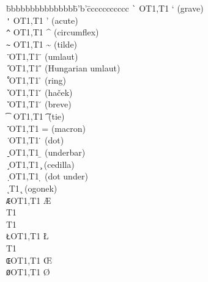 \documentclass{ltxguide}[1994/11/20]
\newcommand\ttverb[1]{\texttt{\string#1}}
\begin{document}
\begin{tabbing}
\ttverb\textvisiblespace\quad\=bbbbbbbbbbbbbb\=b'b'\=ccccccccccc\kill
\ttverb\`{}               \>OT1,T1\>   \a`{}\> (grave)      \\
\ttverb\'{}               \>OT1,T1\>   \a'{}\> (acute)      \\
\ttverb\^{}               \>OT1,T1\>   \^{}\>  (circumflex) \\
\ttverb\~{}               \>OT1,T1\>   \~{}\>  (tilde)      \\
\ttverb\"{}               \>OT1,T1\>   \"{}\>  (umlaut)     \\
\ttverb\H{}               \>OT1,T1\>   \H{}\>  (Hungarian umlaut) \\
\ttverb\r{}               \>OT1,T1\>   \r{}\>  (ring)       \\
\ttverb\v{}               \>OT1,T1\>   \v{}\>  (ha\v{c}ek)  \\
\ttverb\u{}               \>OT1,T1\>   \u{}\>  (breve)      \\
\ttverb\t{}               \>OT1,T1\>   \t{}\>  (tie)        \\
\ttverb\={}               \>OT1,T1\>   \a={}\> (macron)     \\
\ttverb\.{}               \>OT1,T1\>   \.{}\>  (dot)        \\
\ttverb\b{}               \>OT1,T1\>   \b{}\>  (underbar)   \\
\ttverb\c{}               \>OT1,T1\>   \c{}\>  (cedilla)    \\
\ttverb\d{}               \>OT1,T1\>   \d{}\>  (dot under)  \\
\ttverb\k{}               \>T1    \>   \k{}\>  (ogonek)     \\
\ttverb\AE                \>OT1,T1\>   \AE \>               \\
\ttverb\DH                \>T1    \>   \DH \>               \\
\ttverb\DJ                \>T1    \>   \DJ \>               \\
\ttverb\L                 \>OT1,T1\>   \L  \>               \\
\ttverb\NG                \>T1    \>   \NG \>               \\
\ttverb\OE                \>OT1,T1\>   \OE \>               \\
\ttverb\O                 \>OT1,T1\>   \O  \>               \\

\end{tabbing}
\end{document}
